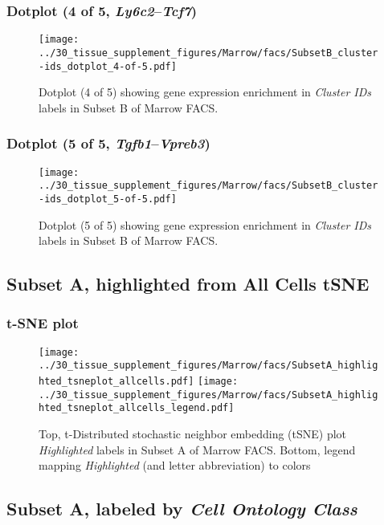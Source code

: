 \clearpage

\subsubsection{Dotplot (4 of 5, \emph{Ly6c2}--\emph{Tcf7})}
\begin{figure}[h]
\centering
\texttt{[image: ../30\_tissue\_supplement\_figures/Marrow/facs/SubsetB\_cluster-ids\_dotplot\_4-of-5.pdf]}

\caption{ Dotplot (4 of 5)  showing gene expression enrichment in \emph{Cluster IDs} labels in Subset B of Marrow FACS. }
\end{figure}


\clearpage

\subsubsection{Dotplot (5 of 5, \emph{Tgfb1}--\emph{Vpreb3})}
\begin{figure}[h]
\centering
\texttt{[image: ../30\_tissue\_supplement\_figures/Marrow/facs/SubsetB\_cluster-ids\_dotplot\_5-of-5.pdf]}

\caption{ Dotplot (5 of 5)  showing gene expression enrichment in \emph{Cluster IDs} labels in Subset B of Marrow FACS. }
\end{figure}


\clearpage
\subsection{Subset A, highlighted from All Cells tSNE}
\subsubsection{t-SNE plot}
\begin{figure}[h]
\centering
\texttt{[image: ../30\_tissue\_supplement\_figures/Marrow/facs/SubsetA\_highlighted\_tsneplot\_allcells.pdf]}
\texttt{[image: ../30\_tissue\_supplement\_figures/Marrow/facs/SubsetA\_highlighted\_tsneplot\_allcells\_legend.pdf]}
\caption{Top, t-Distributed stochastic neighbor embedding (tSNE) plot  \emph{Highlighted} labels in Subset A of Marrow FACS. Bottom, legend mapping \emph{Highlighted} (and letter abbreviation) to colors}
\end{figure}


\clearpage

\subsection{Subset A, labeled by \emph{Cell Ontology Class}}
